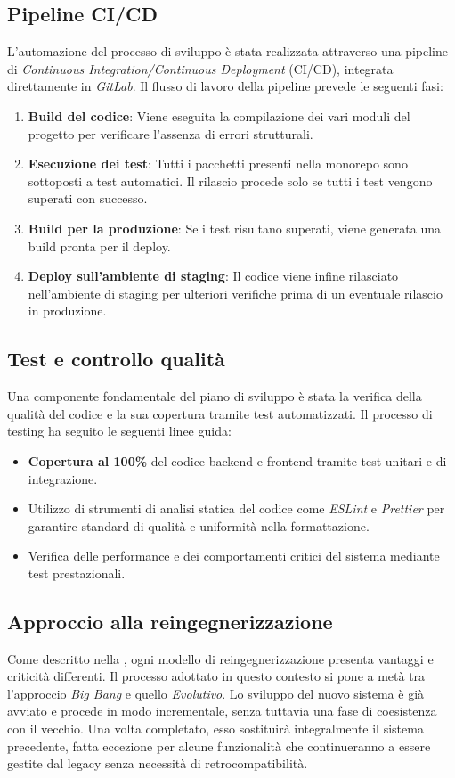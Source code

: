 \subsection{Pipeline CI/CD}
L'automazione del processo di sviluppo è stata realizzata attraverso una pipeline di \textit{Continuous Integration/Continuous Deployment} (CI/CD), integrata direttamente in \textit{GitLab}. Il flusso di lavoro della pipeline prevede le seguenti fasi:
\begin{enumerate}
  \item \textbf{Build del codice}: Viene eseguita la compilazione dei vari moduli del progetto per verificare l'assenza di errori strutturali.
  \item \textbf{Esecuzione dei test}: Tutti i pacchetti presenti nella monorepo sono sottoposti a test automatici. Il rilascio procede solo se tutti i test vengono superati con successo.
  \item \textbf{Build per la produzione}: Se i test risultano superati, viene generata una build pronta per il deploy.
  \item \textbf{Deploy sull'ambiente di staging}: Il codice viene infine rilasciato nell'ambiente di staging per ulteriori verifiche prima di un eventuale rilascio in produzione.
\end{enumerate}

\subsection{Test e controllo qualità}
Una componente fondamentale del piano di sviluppo è stata la verifica della qualità del codice e la sua copertura tramite test automatizzati. Il processo di testing ha seguito le seguenti linee guida:
\begin{itemize}
  \item \textbf{Copertura al 100\%} del codice backend e frontend tramite test unitari e di integrazione.
  \item Utilizzo di strumenti di analisi statica del codice come \textit{ESLint} e \textit{Prettier} per garantire standard di qualità e uniformità nella formattazione.
  \item Verifica delle performance e dei comportamenti critici del sistema mediante test prestazionali.
\end{itemize}

\subsection{Approccio alla reingegnerizzazione}
Come descritto nella , ogni modello di reingegnerizzazione presenta vantaggi e criticità differenti. Il processo adottato in questo contesto si pone a metà tra l'approccio \textit{Big Bang} e quello \textit{Evolutivo}. Lo sviluppo del nuovo sistema è già avviato e procede in modo incrementale, senza tuttavia una fase di coesistenza con il vecchio. Una volta completato, esso sostituirà integralmente il sistema precedente, fatta eccezione per alcune funzionalità che continueranno a essere gestite dal legacy senza necessità di retrocompatibilità.

